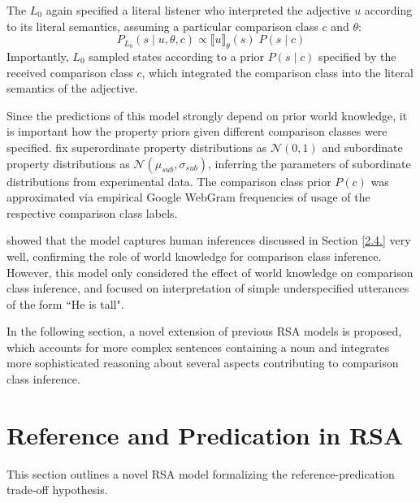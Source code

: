 The $L_0$ again specified a literal listener who interpreted the adjective $u$ according to its literal semantics, assuming a particular comparison class $c$ and $\theta$:
\begin{equation}
P_{L_0}(s \mid u, \theta, c) \propto \llbracket u \rrbracket_{\theta} (s) \; P( s \mid c)
\end{equation}  
Importantly, $L_0$ sampled states according to a prior $P(s \mid c)$ specified by the received comparison class $c$, which integrated the comparison class into the literal semantics of the adjective. 

Since the predictions of this model strongly depend on prior world knowledge, it is important how the property priors given different comparison classes were specified. \textcite{tessler2017warm} fix superordinate property distributions as $\mathcal{N} (0, 1)$ and subordinate property distributions as $\mathcal{N}(\mu_{sub}, \sigma_{sub})$, inferring the parameters of subordinate distributions from experimental data. The comparison class prior $P(c)$ was approximated via empirical Google WebGram frequencies of usage of the respective comparison class labels. 

\textcite{tessler2017warm} showed that the model captures human inferences discussed in Section \ref{2.4.} very well, confirming the role of world knowledge for comparison class inference. 
However, this model only considered the effect of world knowledge on comparison class inference, and focused on interpretation of simple underspecified utterances of the form ``He is tall". 

In the following section, a novel extension of previous RSA models is proposed, which accounts for more complex sentences containing a noun and integrates more sophisticated reasoning about several aspects contributing to comparison class inference.  

\section{Reference and Predication in RSA}
This section outlines a novel RSA model formalizing the reference-predication trade-off hypothesis.

